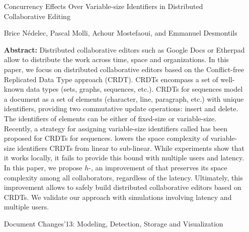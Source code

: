 \begin{itemize}
\item [Concurrency Effects Over Variable-size Identifiers in Distributed
  Collaborative Editing]
\item [Brice Nédelec, Pascal Molli, Achour Mostefaoui, and Emmanuel Desmontils]
\item [\textbf{Abstract:}] Distributed collaborative editors such as Google Docs
  or Etherpad allow to distribute the work across time, space and
  organizations. In this paper, we focus on distributed collaborative editors
  based on the Conflict-free Replicated Data Type approach (CRDT). CRDTs
  encompass a set of well-known data types (sets, graphs, sequences,
  etc.). CRDTs for sequences model a document as a set of elements (character,
  line, paragraph, etc.) with unique identifiers, providing two commutative
  update operations: insert and delete. The identifiers of elements can be
  either of fixed-size or variable-size. Recently, a strategy for assigning
  variable-size identifiers called \LSEQ has been proposed for CRDTs for
  sequences. \LSEQ lowers the space complexity of variable-size identifiers
  CRDTs from linear to sub-linear. While experiments show that it works locally,
  it fails to provide this bound with multiple users and latency. In this paper,
  we propose $h$-\LSEQ, an improvement of \LSEQ that preserves its space
  complexity among all collaborators, regardless of the latency. Ultimately,
  this improvement allows to safely build distributed collaborative editors
  based on CRDTs. We validate our approach with simulations involving latency
  and multiple users.
\item [Document Changes'13: Modeling, Detection, Storage and Visualization]
\end{itemize}